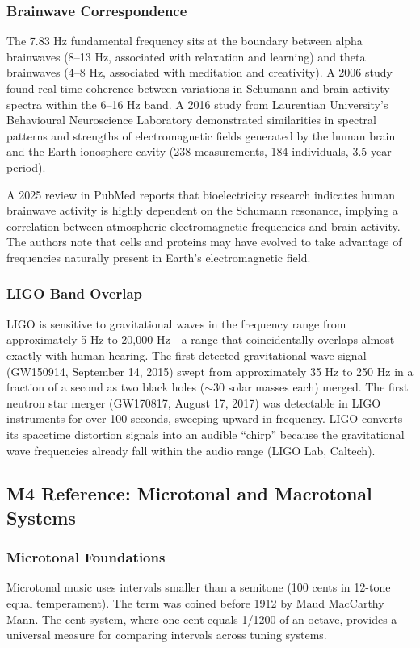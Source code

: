 \documentclass[11pt,letterpaper]{article}
\begin{document}
\subsubsection{Brainwave Correspondence}
The 7.83 Hz fundamental frequency sits at the boundary between alpha brainwaves (8--13 Hz, associated with relaxation and learning) and theta brainwaves (4--8 Hz, associated with meditation and creativity). A 2006 study found real-time coherence between variations in Schumann and brain activity spectra within the 6--16 Hz band. A 2016 study from Laurentian University's Behavioural Neuroscience Laboratory demonstrated similarities in spectral patterns and strengths of electromagnetic fields generated by the human brain and the Earth-ionosphere cavity (238 measurements, 184 individuals, 3.5-year period).

A 2025 review in PubMed reports that bioelectricity research indicates human brainwave activity is highly dependent on the Schumann resonance, implying a correlation between atmospheric electromagnetic frequencies and brain activity. The authors note that cells and proteins may have evolved to take advantage of frequencies naturally present in Earth's electromagnetic field.

\subsubsection{LIGO Band Overlap}
LIGO is sensitive to gravitational waves in the frequency range from approximately 5 Hz to 20,000 Hz---a range that coincidentally overlaps almost exactly with human hearing. The first detected gravitational wave signal (GW150914, September 14, 2015) swept from approximately 35 Hz to 250 Hz in a fraction of a second as two black holes ($\sim$30 solar masses each) merged. The first neutron star merger (GW170817, August 17, 2017) was detectable in LIGO instruments for over 100 seconds, sweeping upward in frequency. LIGO converts its spacetime distortion signals into an audible ``chirp'' because the gravitational wave frequencies already fall within the audio range (LIGO Lab, Caltech).

\subsection{M4 Reference: Microtonal and Macrotonal Systems}

\subsubsection{Microtonal Foundations}
Microtonal music uses intervals smaller than a semitone (100 cents in 12-tone equal temperament). The term was coined before 1912 by Maud MacCarthy Mann. The cent system, where one cent equals 1/1200 of an octave, provides a universal measure for comparing intervals across tuning systems.
\end{document}
